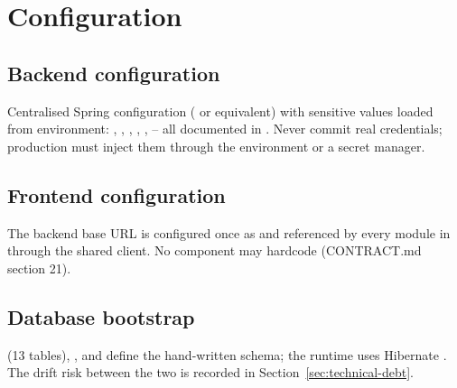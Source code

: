 \section{Configuration}
\label{sec:configuration}

\subsection{Backend configuration}

Centralised Spring configuration ( or equivalent) with sensitive values loaded from environment: , , , , ,  -- all documented in . Never commit real credentials; production must inject them through the environment or a secret manager.

\subsection{Frontend configuration}

The backend base URL is configured once as  and referenced by every module in  through the shared client. No component may hardcode  (CONTRACT.md section 21).

\subsection{Database bootstrap}

 (13 tables), , and  define the hand-written schema; the runtime uses Hibernate . The drift risk between the two is recorded in Section~\ref{sec:technical-debt}.
